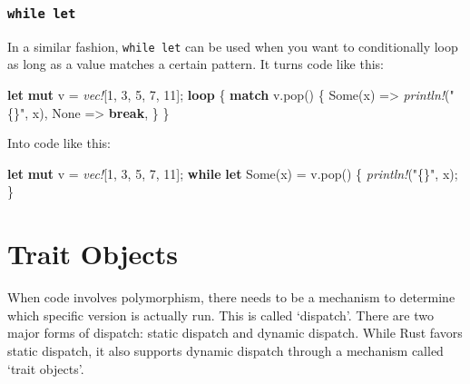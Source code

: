 \documentclass[a4paper,]{book}
\newenvironment{Shaded}{\begin{snugshade}}{\end{snugshade}}
\newcommand{\KeywordTok}[1]{\textcolor[rgb]{0.13,0.29,0.53}{\textbf{{#1}}}}
\newcommand{\DecValTok}[1]{\textcolor[rgb]{0.00,0.00,0.81}{{#1}}}
\newcommand{\ConstantTok}[1]{\textcolor[rgb]{0.00,0.00,0.00}{{#1}}}
\newcommand{\StringTok}[1]{\textcolor[rgb]{0.31,0.60,0.02}{{#1}}}
\newcommand{\PreprocessorTok}[1]{\textcolor[rgb]{0.56,0.35,0.01}{\textit{{#1}}}}
\newcommand{\NormalTok}[1]{{#1}}
\begin{document}
\subsubsection{\texorpdfstring{\texttt{while\ let}}{while let}}\label{while-let}

In a similar fashion, \texttt{while\ let} can be used when you want to
conditionally loop as long as a value matches a certain pattern. It
turns code like this:

\begin{Shaded}
\begin{Highlighting}[]
\KeywordTok{let} \KeywordTok{mut} \NormalTok{v = }\PreprocessorTok{vec!}\NormalTok{[}\DecValTok{1}\NormalTok{, }\DecValTok{3}\NormalTok{, }\DecValTok{5}\NormalTok{, }\DecValTok{7}\NormalTok{, }\DecValTok{11}\NormalTok{];}
\KeywordTok{loop} \NormalTok{\{}
    \KeywordTok{match} \NormalTok{v.pop() \{}
        \ConstantTok{Some}\NormalTok{(x) =>  }\PreprocessorTok{println!}\NormalTok{(}\StringTok{"\{\}"}\NormalTok{, x),}
        \ConstantTok{None} \NormalTok{=> }\KeywordTok{break}\NormalTok{,}
    \NormalTok{\}}
\NormalTok{\}}
\end{Highlighting}
\end{Shaded}

Into code like this:

\begin{Shaded}
\begin{Highlighting}[]
\KeywordTok{let} \KeywordTok{mut} \NormalTok{v = }\PreprocessorTok{vec!}\NormalTok{[}\DecValTok{1}\NormalTok{, }\DecValTok{3}\NormalTok{, }\DecValTok{5}\NormalTok{, }\DecValTok{7}\NormalTok{, }\DecValTok{11}\NormalTok{];}
\KeywordTok{while} \KeywordTok{let} \ConstantTok{Some}\NormalTok{(x) = v.pop() \{}
    \PreprocessorTok{println!}\NormalTok{(}\StringTok{"\{\}"}\NormalTok{, x);}
\NormalTok{\}}
\end{Highlighting}
\end{Shaded}

\hypertarget{sec--trait-objects}{\section{Trait
Objects}\label{sec--trait-objects}}

When code involves polymorphism, there needs to be a mechanism to
determine which specific version is actually run. This is called
`dispatch'. There are two major forms of dispatch: static dispatch and
dynamic dispatch. While Rust favors static dispatch, it also supports
dynamic dispatch through a mechanism called `trait objects'.
\end{document}
